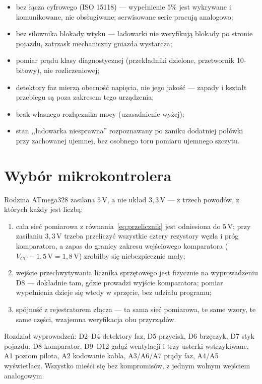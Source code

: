 \documentclass[a4paper,11pt]{article}
\newcommand{\volt}{\,\mathrm{V}}
\begin{document}
\begin{itemize}
\item bez łącza cyfrowego (ISO 15118) --- wypełnienie $5\%$ jest wykrywane
      i komunikowane, nie obsługiwane; serwisowane serie pracują analogowo;
\item bez siłownika blokady wtyku --- ładowarki nie weryfikują blokady po stronie
      pojazdu, zatrzask mechaniczny gniazda wystarcza;
\item pomiar prądu klasy diagnostycznej (przekładniki dzielone, przetwornik
      10-bitowy), nie rozliczeniowej;
\item detektory faz mierzą obecność napięcia, nie jego jakość --- zapady i kształt
      przebiegu są poza zakresem tego urządzenia;
\item brak własnego rozłącznika mocy (uzasadnienie wyżej);
\item stan ,,ładowarka niesprawna'' rozpoznawany po zaniku dodatniej połówki przy
      zachowanej ujemnej, bez osobnego toru pomiaru ujemnego szczytu.
\end{itemize}

\section{Wybór mikrokontrolera}

Rodzina ATmega328 zasilana $5\volt$, a nie układ $3{,}3\volt$ --- z trzech powodów,
z których każdy jest liczbą:

\begin{enumerate}
\item cała sieć pomiarowa z równania~\eqref{eq:przelicznik} jest odniesiona do
      $5\volt$; przy zasilaniu $3{,}3\volt$ trzeba przeliczyć wszystkie cztery
      rezystory węzła i próg komparatora, a zapas do granicy zakresu wejściowego
      komparatora ($V_{CC}-1{,}5\volt = 1{,}8\volt$) zrobiłby się niebezpiecznie
      mały;
\item wejście przechwytywania licznika sprzętowego jest fizycznie na wyprowadzeniu
      D8 --- dokładnie tam, gdzie prowadzi wyjście komparatora; pomiar wypełnienia
      dzieje się wtedy w sprzęcie, bez udziału programu;
\item spójność z rejestratorem złącza --- ta sama sieć pomiarowa, te same wzory,
      te same części, wzajemna weryfikacja obu przyrządów.
\end{enumerate}

Rozdział wyprowadzeń: D2--D4 detektory faz, D5 przycisk, D6 brzęczyk, D7 styk
pojazdu, D8 komparator, D9--D12 gałąź wentylacji i trzy usterki wstrzykiwane,
A1 poziom pilota, A2 kodowanie kabla, A3/A6/A7 prądy faz, A4/A5 wyświetlacz.
Wszystko mieści się bez kompromisów, z jednym wolnym wejściem analogowym.
\end{document}
